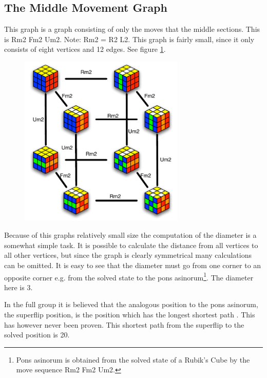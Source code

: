 \subsection{The Middle Movement Graph}
\label{sub:middleMoveGraph}
This graph is a \rubik{} graph consisting of only the moves that \twist{} the middle sections. 
This is Rm2 Fm2 Um2. Note: Rm2 = R2 L2.  This graph is fairly small, since it only consists of eight vertices and 12 edges. See figure \ref{fig:graphMiddleSlice2}. \cite[pp. 158-167]{Rubik87}

\begin{figure}[bht!]
	\centering
		\includegraphics[width = 0.7\textwidth]{input/pics/graphMiddleSlice2.pdf}
	\caption{}
	\label{fig:graphMiddleSlice2}
\end{figure}

Because of this graphs relatively small size the computation of the diameter is a somewhat simple task. It is possible to calculate the distance from all vertices to all other vertices, but since the graph is clearly symmetrical many calculations can be omitted. It is easy to see that the diameter must go from one corner to an opposite corner e.g. from the solved state to the pons asinorum\footnote{Pons asinorum is obtained from the solved state of a Rubik's Cube by the move sequence Rm2 Fm2 Um2.}. The diameter here is 3. 

In the full \rubik{} group it is believed that the analogous position to the pons asinorum, the superflip position, is the position which has the longest shortest path \cite{speedsolving.wiki}. This has however never been proven. This shortest path from the superflip to the solved position is 20\cite{rokicki09}.

